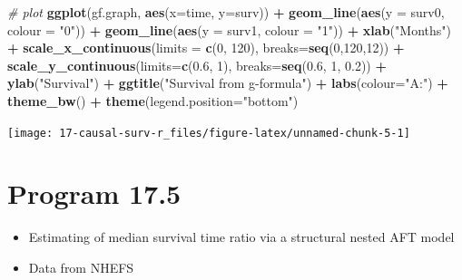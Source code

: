 \documentclass[
  10pt,
]{book}
\newenvironment{Shaded}{\begin{snugshade}}{\end{snugshade}}
\newcommand{\CommentTok}[1]{\textcolor[rgb]{0.56,0.35,0.01}{\textit{#1}}}
\newcommand{\DataTypeTok}[1]{\textcolor[rgb]{0.13,0.29,0.53}{#1}}
\newcommand{\DecValTok}[1]{\textcolor[rgb]{0.00,0.00,0.81}{#1}}
\newcommand{\FloatTok}[1]{\textcolor[rgb]{0.00,0.00,0.81}{#1}}
\newcommand{\KeywordTok}[1]{\textcolor[rgb]{0.13,0.29,0.53}{\textbf{#1}}}
\newcommand{\NormalTok}[1]{#1}
\newcommand{\OperatorTok}[1]{\textcolor[rgb]{0.81,0.36,0.00}{\textbf{#1}}}
\newcommand{\StringTok}[1]{\textcolor[rgb]{0.31,0.60,0.02}{#1}}
\providecommand{\tightlist}{%
  \setlength{\itemsep}{0pt}\setlength{\parskip}{0pt}}
\begin{document}
\begin{Shaded}
\begin{Highlighting}[]
\CommentTok{\# plot}
\KeywordTok{ggplot}\NormalTok{(gf.graph, }\KeywordTok{aes}\NormalTok{(}\DataTypeTok{x=}\NormalTok{time, }\DataTypeTok{y=}\NormalTok{surv)) }\OperatorTok{+}\StringTok{ }
\StringTok{  }\KeywordTok{geom\_line}\NormalTok{(}\KeywordTok{aes}\NormalTok{(}\DataTypeTok{y =}\NormalTok{ surv0, }\DataTypeTok{colour =} \StringTok{"0"}\NormalTok{)) }\OperatorTok{+}\StringTok{ }
\StringTok{  }\KeywordTok{geom\_line}\NormalTok{(}\KeywordTok{aes}\NormalTok{(}\DataTypeTok{y =}\NormalTok{ surv1, }\DataTypeTok{colour =} \StringTok{"1"}\NormalTok{)) }\OperatorTok{+}\StringTok{ }
\StringTok{  }\KeywordTok{xlab}\NormalTok{(}\StringTok{"Months"}\NormalTok{) }\OperatorTok{+}\StringTok{ }
\StringTok{  }\KeywordTok{scale\_x\_continuous}\NormalTok{(}\DataTypeTok{limits =} \KeywordTok{c}\NormalTok{(}\DecValTok{0}\NormalTok{, }\DecValTok{120}\NormalTok{), }\DataTypeTok{breaks=}\KeywordTok{seq}\NormalTok{(}\DecValTok{0}\NormalTok{,}\DecValTok{120}\NormalTok{,}\DecValTok{12}\NormalTok{)) }\OperatorTok{+}
\StringTok{  }\KeywordTok{scale\_y\_continuous}\NormalTok{(}\DataTypeTok{limits=}\KeywordTok{c}\NormalTok{(}\FloatTok{0.6}\NormalTok{, }\DecValTok{1}\NormalTok{), }\DataTypeTok{breaks=}\KeywordTok{seq}\NormalTok{(}\FloatTok{0.6}\NormalTok{, }\DecValTok{1}\NormalTok{, }\FloatTok{0.2}\NormalTok{)) }\OperatorTok{+}
\StringTok{  }\KeywordTok{ylab}\NormalTok{(}\StringTok{"Survival"}\NormalTok{) }\OperatorTok{+}\StringTok{ }
\StringTok{  }\KeywordTok{ggtitle}\NormalTok{(}\StringTok{"Survival from g{-}formula"}\NormalTok{) }\OperatorTok{+}\StringTok{ }
\StringTok{  }\KeywordTok{labs}\NormalTok{(}\DataTypeTok{colour=}\StringTok{"A:"}\NormalTok{) }\OperatorTok{+}
\StringTok{  }\KeywordTok{theme\_bw}\NormalTok{() }\OperatorTok{+}\StringTok{ }
\StringTok{  }\KeywordTok{theme}\NormalTok{(}\DataTypeTok{legend.position=}\StringTok{"bottom"}\NormalTok{)}
\end{Highlighting}
\end{Shaded}

\begin{center}\texttt{[image: 17-causal-surv-r\_files/figure-latex/unnamed-chunk-5-1]} \end{center}

\hypertarget{program-17.5}{%
\section{Program 17.5}\label{program-17.5}}

\begin{itemize}
\tightlist
\item
  Estimating of median survival time ratio via a structural nested AFT model
\item
  Data from NHEFS
\end{itemize}
\end{document}
